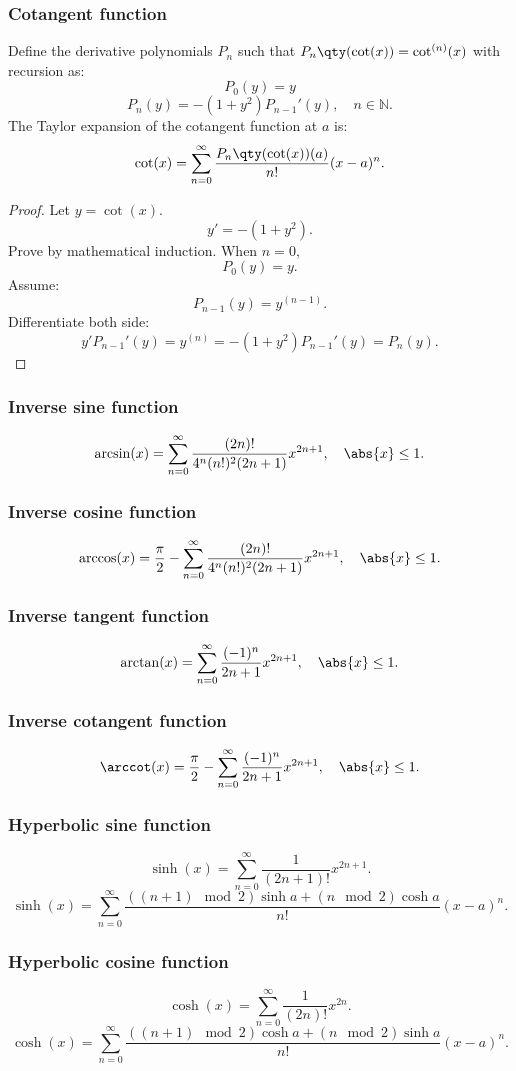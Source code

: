 \documentclass[a4paper,12pt]{report}
\begin{document}
\begin{itemize}
\begin{itemize}
\subsubsection{Cotangent function}
Define the derivative polynomials $P_n$ such that $P_n\qty(\cot(x))=\cot^{(n)}(x)$ with recursion as:
\[P_0(y)=y\]
\[P_n(y)=-(1+y^2)P_{n-1}'(y),\quad n\in\mathbb{N}.\]
The Taylor expansion of the cotangent function at $a$ is:
\[\cot(x)=\sum_{n=0}^{\infty}\frac{P_n\qty(\cot(x))(a)}{n!}(x-a)^n.\]
\begin{proof}
Let $y=\cot(x)$.
\[y'=-(1+y^2).\]
Prove by mathematical induction. When $n=0$,
\[P_0(y)=y.\]
Assume:
\[P_{n-1}(y)=y^{(n-1)}.\]
Differentiate both side:
\[y'P_{n-1}'(y)=y^{(n)}=-(1+y^2)P_{n-1}'(y)=P_n(y).\]
\end{proof}
\subsubsection{Inverse sine function}
\[\arcsin(x)=\sum_{n=0}^{\infty}\frac{(2n)!}{4^n(n!)^2(2n+1)}x^{2n+1},\quad\abs{x}\le1.\]
\subsubsection{Inverse cosine function}
\[\arccos(x)=\frac{\pi}{2}-\sum_{n=0}^{\infty}\frac{(2n)!}{4^n(n!)^2(2n+1)}x^{2n+1},\quad\abs{x}\le1.\]
\subsubsection{Inverse tangent function}
\[\arctan(x)=\sum_{n=0}^{\infty}\frac{(-1)^n}{2n+1}x^{2n+1},\quad\abs{x}\le1.\]
\subsubsection{Inverse cotangent function}
\[\arccot(x)=\frac{\pi}{2}-\sum_{n=0}^{\infty}\frac{(-1)^n}{2n+1}x^{2n+1},\quad\abs{x}\le1.\]
\subsubsection{Hyperbolic sine function}
\[\sinh(x)=\sum_{n=0}^{\infty}\frac{1}{(2n+1)!}x^{2n+1}.\]
\[\sinh(x)=\sum_{n=0}^{\infty}\frac{((n+1)\mod 2)\sinh a+(n\mod 2)\cosh a}{n!}(x-a)^n.\]
\subsubsection{Hyperbolic cosine function}
\[\cosh(x)=\sum_{n=0}^{\infty}\frac{1}{(2n)!}x^{2n}.\]
\[\cosh(x)=\sum_{n=0}^{\infty}\frac{((n+1)\mod 2)\cosh a+(n\mod 2)\sinh a}{n!}(x-a)^n.\]

\end{itemize}
\end{itemize}
\end{document}

